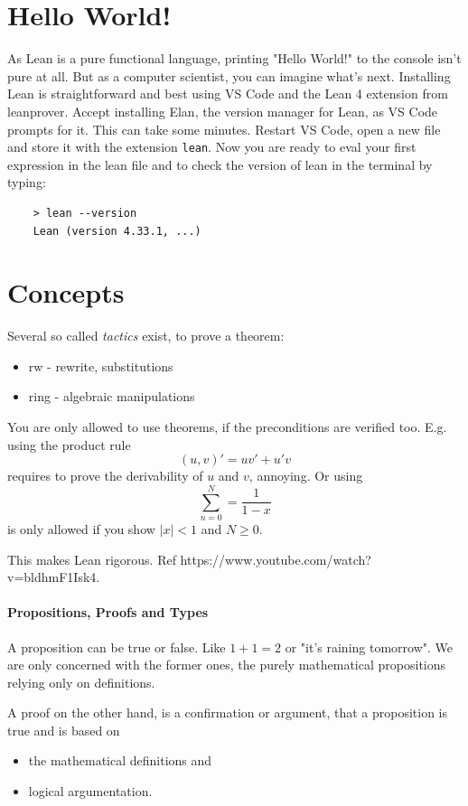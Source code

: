 \section{Hello World!}
As Lean is a pure functional language, printing "Hello World!" to the console isn't pure at all. But as a computer scientist, you can imagine what's next. 
Installing Lean is straightforward and best using VS Code and the Lean 4 extension from leanprover. Accept installing Elan, the version manager for Lean, as VS Code prompts for it. This can take some minutes. Restart VS Code, open a new file and store it with 
the extension \texttt{lean}. Now you are ready to eval your first expression in the lean file and to check the version of lean in the terminal by typing:
\begin{verbatim}
    > lean --version
    Lean (version 4.33.1, ...)
\end{verbatim}

\section{Concepts}

Several so called \textit{tactics} exist, to prove a theorem:
\begin{itemize}
    \item rw - rewrite, substitutions
    \item ring - algebraic manipulations
\end{itemize}

You are only allowed to use theorems, if the preconditions are verified too. E.g. using the product rule
$$ (u,v)' = uv' + u'v$$
requires to prove the derivability of $u$ and $v$, annoying. Or using 
$$\sum^{N}_{n=0} = \frac{1}{1-x}$$
is only allowed if you show $|x|<1$ and $N \geq 0$.

This makes Lean rigorous. Ref https://www.youtube.com/watch?v=bldhmF1Isk4.

\paragraph{Propositions, Proofs and Types}
A proposition can be true or false. Like $1+1=2$ or "it's raining tomorrow". We are only concerned with the former ones, the purely mathematical propositions 
relying only on definitions.

A proof on the other hand, is a confirmation or argument, that a proposition is true and is based on 
\begin{itemize}
    \item the mathematical definitions and
    \item logical argumentation.
\end{itemize}


